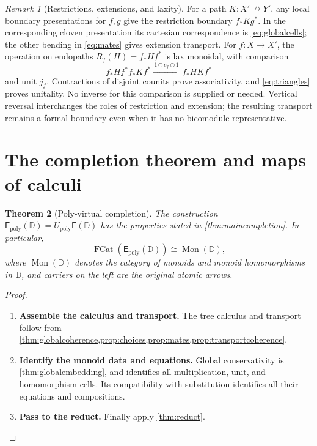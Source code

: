 \documentclass[11pt,reqno]{amsart}
\theoremstyle{plain}
\newtheorem{theorem}{Theorem}[section]
\theoremstyle{definition}
\theoremstyle{remark}
\newtheorem{remark}[theorem]{Remark}
\numberwithin{equation}{section}
\newcommand{\D}{\mathbb D}
\newcommand{\E}{\mathsf E}
\newcommand{\Up}{U_{\mathrm{poly}}}
\newcommand{\harr}{\mathrel{\nrightarrow}}
\newcommand{\Mon}{\operatorname{Mon}}
\newcommand{\FCat}{\operatorname{FCat}}
\newcommand{\wh}{\mathbin{\odot}}
\begin{document}
\begin{remark}[Restrictions, extensions, and laxity]\label{rem:lax}
For a path $K:X'\harr Y'$, any local boundary presentations for
$f,g$ give the restriction boundary $f_*Kg^*$. In the corresponding cloven
presentation its cartesian correspondence is \cref{eq:globalcells};
the other bending in \cref{eq:mates} gives extension transport.
For $f:X\to X'$, the operation on endopaths
$R_f(H)=f_*Hf^*$ is lax monoidal, with comparison
\[
 f_*Hf^*f_*Kf^*
 \xrightarrow{\,1\wh e_f\wh1\,}f_*HKf^*
\]
and unit $j_f$. Contractions of disjoint counits prove associativity,
and \cref{eq:triangles} proves unitality. No inverse for this comparison
is supplied or needed. Vertical reversal interchanges the roles of
restriction and extension; the resulting transport remains a formal
boundary even when it has no bicomodule representative.
\end{remark}

\section{The completion theorem and maps of calculi}\label{sec:completion}

\begin{theorem}[Poly-virtual completion]\label{thm:completion}
The construction
$\E_{\mathrm{poly}}(\D)=\Up\E(\D)$ has the properties stated in
\cref{thm:maincompletion}. In particular,
\[
 \FCat(\E_{\mathrm{poly}}(\D))\cong\Mon(\D),
\]
where $\Mon(\D)$ denotes the category of monoids and monoid
homomorphisms in $\D$, and carriers on the left are the original atomic
arrows.
\end{theorem}
\begin{proof}\leavevmode
\begin{enumerate}
\item \textbf{Assemble the calculus and transport.} The tree calculus and transport follow from
\cref{thm:globalcoherence,prop:choices,prop:mates,prop:transportcoherence}.

\item \textbf{Identify the monoid data and equations.} Global conservativity is
\cref{thm:globalembedding}, and identifies all multiplication, unit,
and homomorphism cells. Its compatibility with substitution identifies
all their equations and compositions.

\item \textbf{Pass to the reduct.} Finally apply \cref{thm:reduct}.\qedhere
\end{enumerate}
\end{proof}
\end{document}
